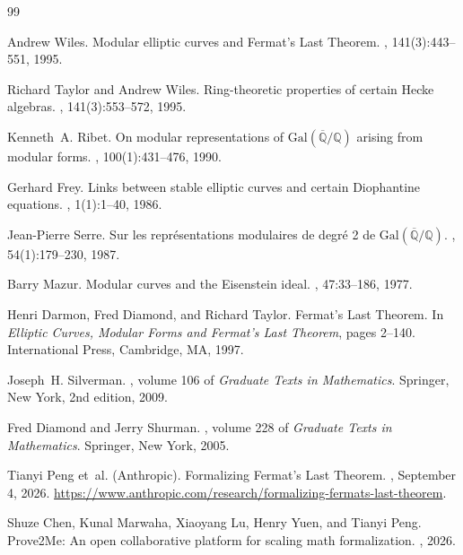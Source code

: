 \documentclass[11pt,a4paper]{article}
\theoremstyle{plain}
\theoremstyle{definition}
\theoremstyle{remark}
\begin{document}
\begin{thebibliography}{99}

Andrew Wiles.
\newblock Modular elliptic curves and Fermat's Last Theorem.
, 141(3):443--551, 1995.

Richard Taylor and Andrew Wiles.
\newblock Ring-theoretic properties of certain Hecke algebras.
, 141(3):553--572, 1995.

Kenneth~A. Ribet.
\newblock On modular representations of $\mathrm{Gal}(\overline{\mathbb{Q}}/\mathbb{Q})$ arising from modular forms.
, 100(1):431--476, 1990.

Gerhard Frey.
\newblock Links between stable elliptic curves and certain Diophantine equations.
, 1(1):1--40, 1986.

Jean-Pierre Serre.
\newblock Sur les repr\'esentations modulaires de degr\'e 2 de $\mathrm{Gal}(\overline{\mathbb{Q}}/\mathbb{Q})$.
, 54(1):179--230, 1987.

Barry Mazur.
\newblock Modular curves and the Eisenstein ideal.
, 47:33--186, 1977.

Henri Darmon, Fred Diamond, and Richard Taylor.
\newblock Fermat's Last Theorem.
\newblock In {\em Elliptic Curves, Modular Forms and Fermat's Last Theorem}, pages 2--140. International Press, Cambridge, MA, 1997.

Joseph~H. Silverman.
, volume 106 of {\em Graduate Texts in Mathematics}.
\newblock Springer, New York, 2nd edition, 2009.

Fred Diamond and Jerry Shurman.
, volume 228 of {\em Graduate Texts in Mathematics}.
\newblock Springer, New York, 2005.

Tianyi Peng et~al. (Anthropic).
\newblock Formalizing Fermat's Last Theorem.
, September 4, 2026.
\newblock \url{https://www.anthropic.com/research/formalizing-fermats-last-theorem}.

Shuze Chen, Kunal Marwaha, Xiaoyang Lu, Henry Yuen, and Tianyi Peng.
\newblock Prove2Me: An open collaborative platform for scaling math formalization.
, 2026.

\end{thebibliography}
\end{document}
